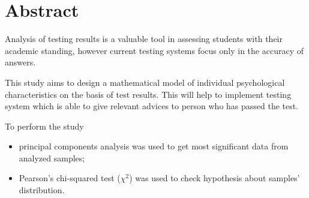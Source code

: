 \chapter*{Abstract}
\thispagestyle{empty}

Analysis of testing results is a valuable tool in assessing students
with their academic standing, however current testing systems focus
only in the accuracy of answers.

This study aims to design a mathematical model of individual
psychological characteristics on the basis of test results.
This will help to implement testing system which is able
to give relevant advices to person who has passed the test.

To perform the study
\begin{itemize}
  \item 
    principal components analysis was used
    to get most significant data from analyzed samples;
  \item
    Pearson's chi-squared test ($\chi^2$) was used to check
    hypothesis about samples' distribution.
\end{itemize}
